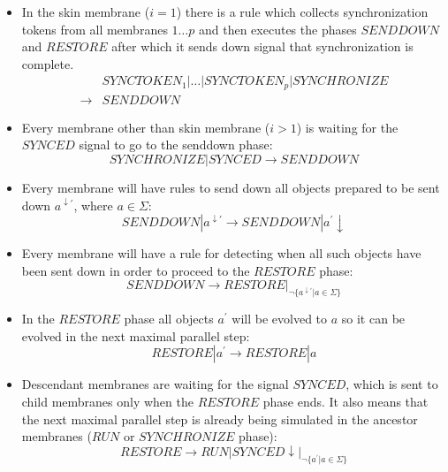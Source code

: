 \begin{dokaz}
\begin{itemize}
    \item In the skin membrane ($i=1$) there is a rule which collects synchronization tokens from all membranes $1\dots p$ and then executes the phases $\mathit{SENDDOWN}$ and $\mathit{RESTORE}$ after which it sends down signal that synchronization is complete.
    \begin{align*}
      &\mathit{SYNCTOKEN_1}|\dots|\mathit{SYNCTOKEN_p}|\mathit{SYNCHRONIZE} \\
      \rightarrow &\mathit{SENDDOWN}
    \end{align*}

    \item Every membrane other than skin membrane ($i>1$) is waiting for the $\mathit{SYNCED}$ signal to go to the senddown phase:
    $$\mathit{SYNCHRONIZE}|\mathit{SYNCED} \rightarrow \mathit{SENDDOWN}$$

    \item Every membrane will have rules to send down all objects prepared to be sent down $a^{\downarrow\prime}$, where $a\in \Sigma$:
    $$\mathit{SENDDOWN}|a^{\downarrow\prime} \rightarrow \mathit{SENDDOWN}|a^{\prime}\downarrow$$

    \item Every membrane will have a rule for detecting when all such objects have been sent down in order to proceed to the $\mathit{RESTORE}$ phase:
    $$\mathit{SENDDOWN} \rightarrow \mathit{RESTORE}|_{\neg \{a^{\downarrow\prime}|a\in\Sigma\}}$$

    \item In the $\mathit{RESTORE}$ phase all objects $a^{\prime}$ will be evolved to $a$ so it can be evolved in the next maximal parallel step:
    $$\mathit{RESTORE}|a^{\prime} \rightarrow \mathit{RESTORE}|a$$

    \item Descendant membranes are waiting for the signal $\mathit{SYNCED}$, which is sent to child membranes only when the $\mathit{RESTORE}$ phase ends. It also means that the next maximal parallel step is already being simulated in the ancestor membranes ($\mathit{RUN}$ or $\mathit{SYNCHRONIZE}$ phase):
    $$\mathit{RESTORE} \rightarrow \mathit{RUN}|\mathit{SYNCED}\downarrow|_{\neg \{a^{\prime}|a\in\Sigma\}}$$
  \end{itemize}

  \providecommand{\narrow}[1]{\scalebox{.85}[1.0]{#1}}


\end{dokaz}
